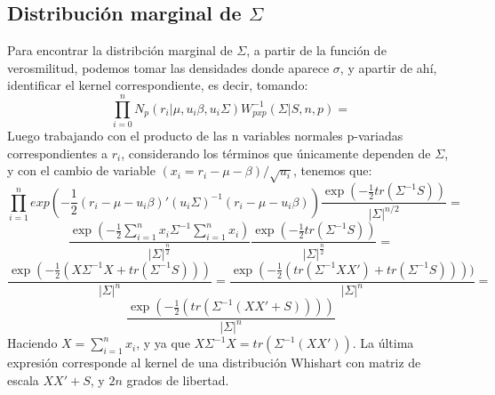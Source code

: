 \documentclass[11pt]{book}
\begin{document}
\subsection*{Distribución marginal de $\Sigma$}
Para encontrar la distribción marginal de $\Sigma$, a partir de la función de verosmilitud, podemos tomar las densidades donde aparece $\sigma$, y apartir de ahí, identificar el kernel correspondiente, es decir, tomando: 
\begin{equation*}
\prod_{i=0}^{n}N_{p}(r_{i}|\mu,u_{i}\beta,u_{i}\Sigma)W^{-1}_{pxp}(\Sigma|S,n,p)=
\end{equation*}
Luego trabajando con el producto de las n variables normales p-variadas correspondientes a $r_{i}$, considerando los términos que únicamente dependen de $\Sigma$, y con el cambio de variable $(x_{i}=r_{i}-\mu-\beta)/\sqrt{u_{i}}$, tenemos que:
\begin{equation*}
\prod_{i=1}^{n}exp(-\dfrac{1}{2}(r_{i}-\mu-u_{i}\beta)'(u_{i}\Sigma)^{-1}(r_{i}-\mu-u_{i}\beta))\dfrac{\exp(-\frac{1}{2}tr(\Sigma^{-1}S))}{|\Sigma|^{n/2}}=
\end{equation*}
\begin{equation*}
\dfrac{\exp(-\frac{1}{2}\sum_{i=1}^{n}x_{i}\Sigma^{-1}\sum_{i=1}^{n}x_{i})}{|\Sigma|^{\frac{n}{2}}}\dfrac{\exp(-\frac{1}{2}tr(\Sigma^{-1}S))}{|\Sigma|^{\frac{n}{2}}}=
\end{equation*}
\begin{equation*}
\dfrac{\exp(-\frac{1}{2}(X\Sigma^{-1}X + tr(\Sigma^{-1}S)))}{|\Sigma|^{n}}=\dfrac{\exp(-\frac{1}{2}(tr(\Sigma^{-1}XX') + tr(\Sigma^{-1}S))))}{|\Sigma|^{n}}=
\end{equation*}
\begin{equation*}
\dfrac{\exp(-\frac{1}{2}(tr(\Sigma^{-1}(XX' + S))))}{|\Sigma|^{n}}
\end{equation*}
Haciendo $X=\sum_{i=1}^{n}x_{i}$, y ya que $X\Sigma^{-1}X=tr(\Sigma^{-1}(XX')) $. La última expresión corresponde al kernel de una distribución Whishart con matriz de escala $XX'+ S$, y $2n$ grados de libertad.
\end{document}

